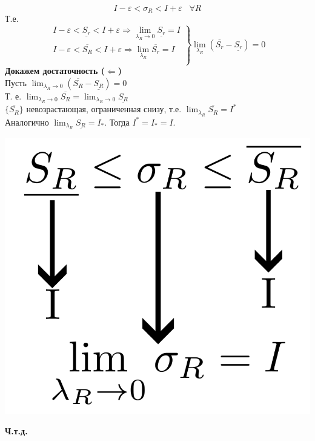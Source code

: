 \documentclass[12pt]{article}
\let\ORIincludegraphics\includegraphics
\renewcommand{\includegraphics}[2][]{\ORIincludegraphics[scale=0.65,#1]{#2}}
\begin{document}
\begin{enumerate}
\begin{adjustwidth}{1.5em}{1.5em}
            \[ I - \varepsilon < \sigma_R < I+\varepsilon \;\;\; \forall R \]
            Т.е.
            \[ \left.\begin{matrix}
                I-\varepsilon < \underline{S_r}<I+\varepsilon \Rightarrow \lim_{\lambda_R \to 0} \underline{S_r}=I\\
                I-\varepsilon < \overline{S_R} < I + \varepsilon \Rightarrow \lim_{\lambda_R} \overline{S_r} = I\\
            \end{matrix}\right\rbrace \lim_{\lambda_R}(\overline{S_r}-\underline{S_r})=0\]\noindent
            \textbf{Докажем достаточность ($\Leftarrow$)}\\
            Пусть $\lim_{\lambda_R \to 0}(\overline{S_R}-\underline{S_R})=0$\\
            Т. е. $\lim_{\lambda_R \to 0} \overline{S_R} = \lim_{\lambda_R \to 0} \underline{S_R}$\\
            $\{\overline{S_R}\}$ невозрастающая, ограниченная снизу, т.е. $\lim_{\lambda_R} \overline{S_R} = I^*$\\
            Аналогично $\lim_{\lambda_R} \underline{S_R} = I_*$. Тогда $I^* = I_* = I$.\\
            \begin{center}
                \includegraphics[scale=0.5]{6.4.2.png}
            \end{center}
            \begin{center}
                \textbf{Ч.т.д.}
            \end{center}
        \end{adjustwidth}
    \end{enumerate}
\end{document}
